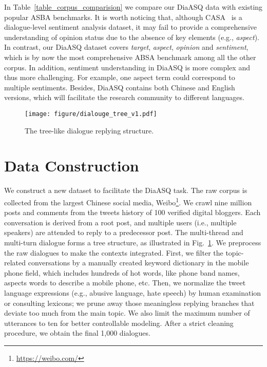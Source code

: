 \documentclass[11pt]{article}
\begin{document}
In Table~\ref{table_corpus_comparision} we compare our DiaASQ data with existing popular ASBA benchmarks.
It is worth noticing that, although CASA~\cite{song-casa-2022} is a dialogue-level sentiment analysis dataset, it may fail to provide a comprehensive understanding of opinion status due to the absence of key elements (e.g., \textit{aspect}).
In contrast, our DiaASQ dataset covers \textit{target}, \textit{aspect}, \textit{opinion} and \textit{sentiment}, which is by now the most comprehensive ABSA benchmark among all the other corpus.
In addition, sentiment understanding in DiaASQ is more complex and thus more challenging.
For example, one aspect term could correspond to multiple sentiments.
Besides, DiaASQ contains both Chinese and English versions, which will facilitate the research community to different languages.

\begin{figure}[!t]
  \centering
  \texttt{[image: figure/dialouge\_tree\_v1.pdf]}
  \vspace{-3pt}
  \caption{
  The tree-like dialogue replying structure.
}
  \label{fig:tree}
  \vspace{-10pt}
\end{figure}

\section{Data Construction}
\vspace{-1mm}
We construct a new dataset to facilitate the DiaASQ task.
The raw corpus is collected from the largest Chinese social media, Weibo\footnote{\url{https://weibo.com/}}.
We crawl nine million posts and comments from the tweets history of 100 verified digital bloggers.
Each conversation is derived from a root post, and multiple users (i.e., multiple speakers) are attended to reply to a predecessor post.
The multi-thread and multi-turn dialogue forms a tree structure, as illustrated in Fig.~\ref{fig:tree}.
We preprocess the raw dialogues to make the contexts integrated.
First, we filter the topic-related conversations by a manually created keyword dictionary in the mobile phone field, which includes hundreds of hot words, like phone band names, aspects words to describe a mobile phone, etc.
Then, we normalize the tweet language expressions (e.g., abusive language, hate speech) by human examination or consulting lexicons; we prune away those meaningless replying branches that deviate too much from the main topic.
We also limit the maximum number of utterances to ten for better controllable modeling.
After a strict cleaning procedure, we obtain the final 1,000 dialogues.
\end{document}
